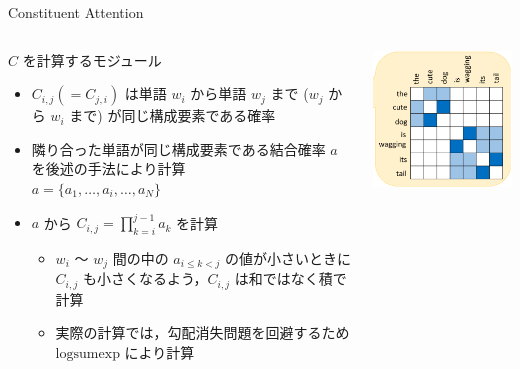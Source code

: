 \documentclass[unicode, 12pt, aspectratio=43]{beamer}
\begin{document}
\begin{frame}[label={sec:org69785e0}]{Constituent Attention}
\begin{columns}
\begin{column}{0.8\columnwidth}
\begin{block}{\(C\) を計算するモジュール}
\begin{itemize}
\item \(C_{i,j} (= C_{j, i})\) は単語 \(w_i\) から単語 \(w_j\) まで (\(w_j\) から \(w_i\) まで) が同じ構成要素である確率
\item 隣り合った単語が同じ構成要素である結合確率 \(a\) を後述の手法により計算 \\ \(a = \{a_1, \ldots, a_i, \ldots, a_N\}\)
\item \(a\) から \(C_{i,j} = \prod_{k=i}^{j-1} a_k\) を計算
\begin{itemize}
\item \(w_i\) 〜 \(w_j\) 間の中の \(a_{i \le k < j}\) の値が小さいときに \(C_{i,j}\) も小さくなるよう，\(C_{i, j}\) は和ではなく積で計算
\item 実際の計算では，勾配消失問題を回避するため \(\mathrm{logsumexp}\) により計算
\end{itemize}
\end{itemize}
\end{block}
\end{column}

\begin{column}{0.25\columnwidth}
\begin{center}
\includegraphics[width=1.0\linewidth]{./figure/Figure1_c.pdf}
\end{center}
\end{column}
\end{columns}
\end{frame}
\end{document}
